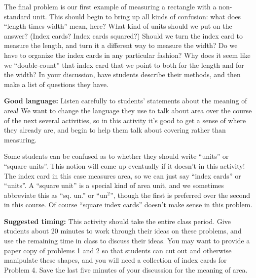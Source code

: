 \documentclass[nooutcomes,noauthor]{ximera}
\begin{document}
\begin{instructorNotes}
The final problem is our first example of measuring a rectangle with a non-standard unit. This should begin to bring up all kinds of confusion: what does ``length times width'' mean, here? What kind of units should we put on the answer? (Index cards? Index cards squared?) Should we turn the index card to measure the length, and turn it a different way to measure the width? Do we have to organize the index cards in any particular fashion? Why does it seem like we ``double-count'' that index card that we point to both for the length and for the width? In your discussion, have students describe their methods, and then make a list of questions they have. 






{\bf Good language:} Listen carefully to students' statements about the meaning of area! We want to change the language they use to talk about area over the course of the next several activities, so in this activity it's good to get a sense of where they already are, and begin to help them talk about covering rather than measuring.

Some students can be confused as to whether they should write ``units'' or ``square units''. This notion will come up eventually if it doesn't in this activity!  The index card in this case measures area, so we can just say ``index cards'' or ``units''.  A ``square unit'' is a special kind of area unit, and we sometimes abbreviate this as ``sq. un.'' or ``un$^2$'', though the first is preferred over the second in this course. Of course ``square index cards'' doesn't make sense in this problem.

{\bf Suggested timing:} This activity should take the entire class period. Give students about 20 minutes to work through their ideas on these problems, and use the remaining time in class to discuss their ideas. You may want to provide a paper copy of problems 1 and 2 so that students can cut out and otherwise manipulate these shapes, and you will need a collection of index cards for Problem 4. Save the last five minutes of your discussion for the meaning of area.



\end{instructorNotes}
\end{document}
